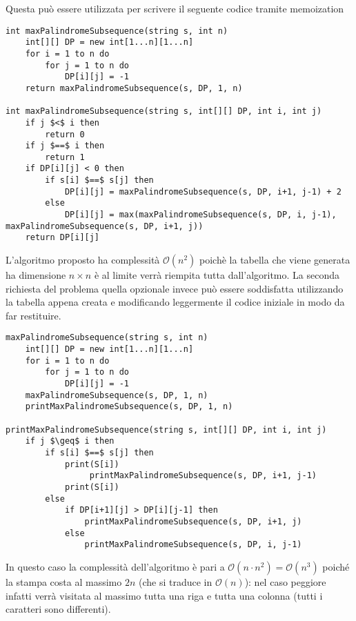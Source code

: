 \documentclass[../cheatSheetAlgoritmi.tex]{subfiles}
\begin{document}
Questa può essere utilizzata per scrivere il seguente codice tramite memoization
\begin{lstlisting}[caption=Sottosequenza Palindroma Massimale]
int maxPalindromeSubsequence(string s, int n)
	int[][] DP = new int[1...n][1...n]
	for i = 1 to n do
		for j = 1 to n do
			DP[i][j] = -1
	return maxPalindromeSubsequence(s, DP, 1, n)
	
int maxPalindromeSubsequence(string s, int[][] DP, int i, int j)
	if j $<$ i then
		return 0
	if j $==$ i then
		return 1
	if DP[i][j] < 0 then
		if s[i] $==$ s[j] then
			DP[i][j] = maxPalindromeSubsequence(s, DP, i+1, j-1) + 2
		else 
			DP[i][j] = max(maxPalindromeSubsequence(s, DP, i, j-1), maxPalindromeSubsequence(s, DP, i+1, j)) 
	return DP[i][j]
\end{lstlisting}
L'algoritmo proposto ha complessità $\mathcal{O}(n^{2})$ poichè la tabella che viene generata ha dimensione $n \times n$ è al limite verrà riempita tutta dall'algoritmo. La seconda richiesta del problema quella opzionale invece può essere soddisfatta utilizzando la tabella appena creata e modificando leggermente il codice iniziale in modo da far restituire.
\begin{lstlisting}[caption=Stampa Sottosequenza Palindroma Massimale]
maxPalindromeSubsequence(string s, int n)
	int[][] DP = new int[1...n][1...n]
	for i = 1 to n do
		for j = 1 to n do
			DP[i][j] = -1
	maxPalindromeSubsequence(s, DP, 1, n)
	printMaxPalindromeSubsequence(s, DP, 1, n)
	
printMaxPalindromeSubsequence(string s, int[][] DP, int i, int j)
	if j $\geq$ i then 
		if s[i] $==$ s[j] then
			print(S[i])
				 printMaxPalindromeSubsequence(s, DP, i+1, j-1)
			print(S[i])
		else 
			if DP[i+1][j] > DP[i][j-1] then
				printMaxPalindromeSubsequence(s, DP, i+1, j)
			else
				printMaxPalindromeSubsequence(s, DP, i, j-1)
\end{lstlisting}
In questo caso la complessità dell'algoritmo è pari a $\mathcal{O}(n \cdot n^{2}) = \mathcal{O}(n^{3})$ poiché la stampa costa al massimo $2n$ (che si traduce in $\mathcal{O}(n)$): nel caso peggiore infatti verrà visitata al massimo tutta una riga e tutta una colonna (tutti i caratteri sono differenti).
\newpage
\end{document}
